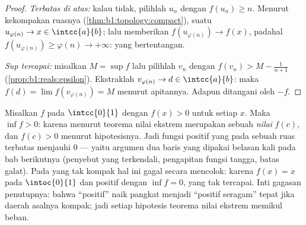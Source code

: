 \begin{proof}
\emph{Terbatas di atas:} kalau tidak, pilihlah $u_n$ dengan $f(u_n) \geq n$. Menurut
kekompakan ruasnya (\cref{thm:b1:topology:compact}), suatu
 $u_{\varphi(n)} \to x \in \intcc{a}{b}$; lalu  memberikan
$f(u_{\varphi(n)}) \to f(x)$, padahal $f(u_{\varphi(n)}) \geq \varphi(n)
\to +\infty$: yang bertentangan.

\emph{Sup tercapai:} misalkan $M = \sup f$ lalu pilihlah $v_n$ dengan $f(v_n) >
M - \frac{1}{n+1}$ (\cref{prop:b1:reals:epsilon}). Ekstraklah
$v_{\varphi(n)} \to d \in \intcc{a}{b}$: maka $f(d) = \lim
f(v_{\varphi(n)}) = M$ menurut apitannya. Adapun  ditangani oleh
$-f$.
\end{proof}

\begin{example}\label{ex:b1:continuity:posmin}
Misalkan $f$  pada $\intcc{0}{1}$ dengan $f(x) > 0$ untuk
setiap $x$. Maka $\inf f > 0$: karena menurut teorema nilai ekstrem
 merupakan sebuah \emph{nilai} $f(c)$, dan $f(c) > 0$ menurut hipotesisnya.
Jadi fungsi positif yang  pada sebuah ruas terbatas menjauhi
$0$ --- yaitu argumen dua baris yang dipakai belasan kali pada
bab berikutnya (penyebut yang terkendali, pengapitan fungsi
tangga, batas galat). Pada  yang tak kompak hal ini gagal
secara mencolok: karena $f(x) = x$ pada $\intoc{0}{1}$  dan
positif dengan $\inf f = 0$, yang tak tercapai. Inti gagasan penutupnya:
bahwa ``positif'' naik pangkat menjadi ``positif seragam'' tepat jika
daerah asalnya kompak; jadi setiap hipotesis teorema nilai ekstrem
memikul beban.
\end{example}

